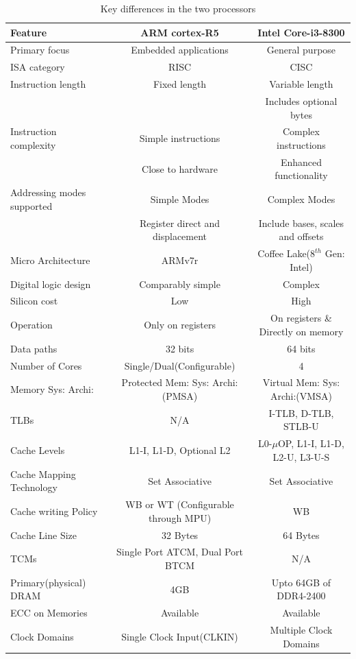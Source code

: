 \documentclass[a4paper,11pt]{article}
\begin{document}
\begin{table}[!h]
	\centering
	\begin{tabular}{l ||c| c }
		\textbf{Feature} &\textbf{ARM cortex-R5}&\textbf{Intel Core-i3-8300}\\\hline
		Primary focus & Embedded applications & General purpose\\
		ISA category&RISC&CISC\\
		Instruction length & Fixed length & Variable length\\
		& & Includes optional bytes\\
		Instruction complexity & Simple instructions & Complex instructions\\
		& Close to hardware & Enhanced functionality\\
		Addressing modes supported & Simple Modes & Complex Modes\\
		& Register direct and displacement & Include bases, scales and offsets\\
		Micro Architecture &ARMv7r&Coffee Lake($8^{th}$ Gen: Intel)\\
		Digital logic design&	Comparably simple	&Complex\\
		Silicon cost&	Low	&High\\
		Operation	&Only on registers&	On registers \& Directly on memory \\
		Data paths&	32 bits	&64 bits\\

		Number of Cores& Single/Dual(Configurable)&4\\
		Memory Sys: Archi:&Protected Mem: Sys: Archi:(PMSA)&Virtual Mem: Sys: Archi:(VMSA)\\
		TLBs&N/A&I-TLB, D-TLB, STLB-U\\
		Cache  Levels& L1-I, L1-D, Optional L2  & L0-$\mu$OP, L1-I,   L1-D, L2-U, L3-U-S\\
		Cache Mapping Technology&Set Associative&Set Associative\\
		Cache writing Policy&WB or WT (Configurable through MPU)& WB\\
		Cache Line Size&32 Bytes&64 Bytes\\
		TCMs&Single Port ATCM, Dual Port BTCM&N/A\\
		Primary(physical) DRAM& 4GB&Upto 64GB of DDR4-2400\\
		ECC on Memories& Available& Available\\
		Clock Domains& Single Clock Input(CLKIN)&Multiple Clock Domains\\
		\hline\hline
	\end{tabular}
	\caption{Key differences in the two processors}
\end{table}
\end{document}
